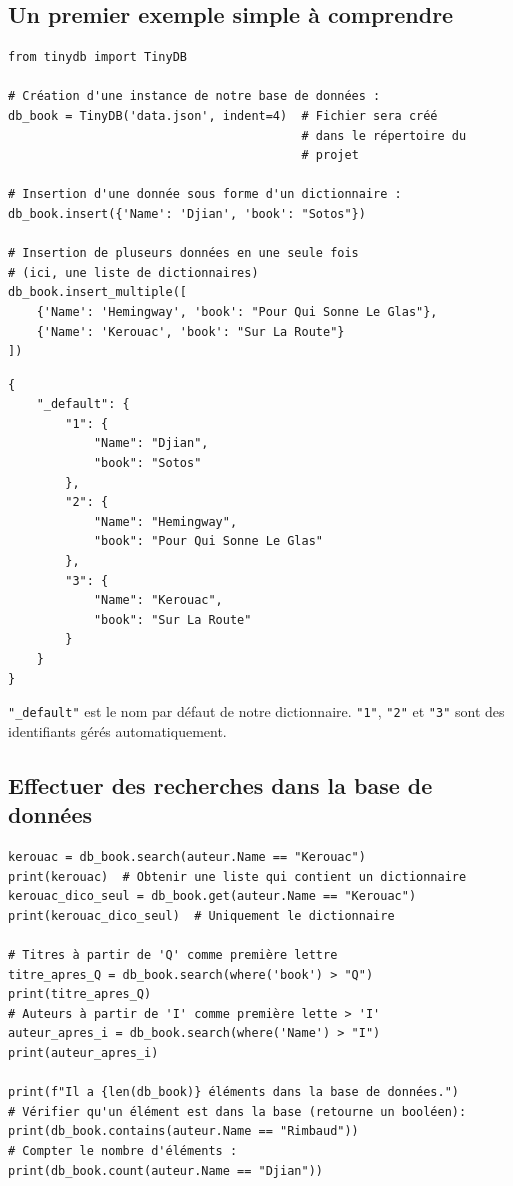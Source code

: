 \documentclass[a4paper,11pt]{book}
\begin{document}
\subsection*{Un premier exemple simple à comprendre}
\begin{lstlisting}[caption=Le fichier \texttt{Python}]
from tinydb import TinyDB

# Création d'une instance de notre base de données :
db_book = TinyDB('data.json', indent=4)  # Fichier sera créé 
                                         # dans le répertoire du 
                                         # projet

# Insertion d'une donnée sous forme d'un dictionnaire :
db_book.insert({'Name': 'Djian', 'book': "Sotos"})

# Insertion de pluseurs données en une seule fois
# (ici, une liste de dictionnaires)
db_book.insert_multiple([
    {'Name': 'Hemingway', 'book': "Pour Qui Sonne Le Glas"},
    {'Name': 'Kerouac', 'book': "Sur La Route"}
])
\end{lstlisting}
\medskip

\begin{lstlisting}[caption=Le fichier \texttt{.json} généré]
{
    "_default": {
        "1": {
            "Name": "Djian",
            "book": "Sotos"
        },
        "2": {
            "Name": "Hemingway",
            "book": "Pour Qui Sonne Le Glas"
        },
        "3": {
            "Name": "Kerouac",
            "book": "Sur La Route"
        }
    }
}
\end{lstlisting}
\medskip

\texttt{"\_default"} est le nom par défaut de notre dictionnaire. \texttt{"1"}, \texttt{"2"} et \texttt{"3"} sont des identifiants gérés automatiquement.
\medskip

\subsection*{Effectuer des recherches dans la base de données}
\begin{lstlisting}[caption=Quelques recherches dans la base de données]
kerouac = db_book.search(auteur.Name == "Kerouac")
print(kerouac)  # Obtenir une liste qui contient un dictionnaire
kerouac_dico_seul = db_book.get(auteur.Name == "Kerouac")
print(kerouac_dico_seul)  # Uniquement le dictionnaire

# Titres à partir de 'Q' comme première lettre
titre_apres_Q = db_book.search(where('book') > "Q")
print(titre_apres_Q)  
# Auteurs à partir de 'I' comme première lette > 'I'
auteur_apres_i = db_book.search(where('Name') > "I")
print(auteur_apres_i)  

print(f"Il a {len(db_book)} éléments dans la base de données.")
# Vérifier qu'un élément est dans la base (retourne un booléen):
print(db_book.contains(auteur.Name == "Rimbaud"))
# Compter le nombre d'éléments :
print(db_book.count(auteur.Name == "Djian"))
\end{lstlisting}
\medskip
\end{document}
